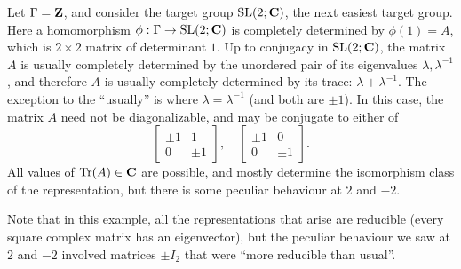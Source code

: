 \documentclass[11pt, oneside, usenames, dvipsnames, svgnames, table, draft]{amsart}
\begin{document}
\begin{example}
  Let $\Gamma = \mathbf{Z}$, and consider the target group $\operatorname{SL}(2; \mathbf{C})$, the next easiest target group. Here a homomorphism $\phi : \Gamma \to \operatorname{SL}(2; \mathbf{C})$ is completely determined by
  $\phi(1)=A$, which is $2\times 2$ matrix of determinant $1$. Up to conjugacy in $\operatorname{SL}(2; \mathbf{C})$, the matrix $A$ is
  usually completely determined by the unordered pair of its eigenvalues $\lambda, \lambda^{-1}$, and therefore $A$ is
  usually completely determined by its trace: $\lambda + \lambda^{-1}$. The exception to the ``usually'' is where
  $\lambda =  \lambda^{-1}$ (and both are $\pm 1$). In this case, the matrix $A$ need not be diagonalizable, and may be conjugate to either
  of
  \[
    \begin{bmatrix}
     \pm  1 & 1 \\ 0 &  \pm 1 
    \end{bmatrix}, \quad
    \begin{bmatrix}
     \pm 1 & 0 \\ 0 & \pm 1 
    \end{bmatrix}.
  \]
  All values of $\operatorname{Tr}(A) \in \mathbf{C}$ are possible, and mostly determine the isomorphism class of the representation, but
  there is some peculiar behaviour at $2$ and $-2$.

  Note that in this example, all the representations that arise are reducible (every square complex matrix has an
  eigenvector), but the peculiar behaviour we saw at $2$ and $-2$ involved matrices $\pm I_2$ that were ``more reducible
  than usual''.
\end{example}
\end{document}
